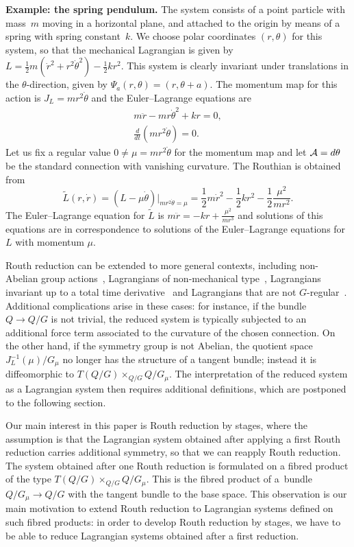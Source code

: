 \documentclass[pdftex]{sigma}
\newcommand{\A}{{\cal A}}
\begin{document}
{\bf Example: the spring pendulum.} The system consists of a point particle with mass~$m$ moving in a horizontal plane, and attached to the origin by means of a spring with spring constant~$k$.  We choose polar coordinates $(r,\theta)$ for this system, so that the mechanical Lagrangian is given by $L = \frac12 m (\dot r^2+ r^2\dot\theta^2)  - \frac12 k r^2$.  This system is clearly invariant under translations in the $\theta$-direction, given by  $\Psi_{a}(r,\theta) = (r,\theta+a)$. The momentum map for this action is $J_L=mr^2\dot\theta$ and the Euler--Lagrange equations are
\begin{gather*} m\ddot r - mr\dot\theta^2+kr =0,\\
\frac{d}{dt} (mr^2\dot\theta)= 0.
\end{gather*}
Let us f\/ix a regular value $0\neq\mu=mr^2\dot\theta$ for the momentum map and let $\A = d\theta$ be the standard connection with vanishing curvature. The Routhian is obtained from \[\tilde L(r,\dot r)=(L-\mu\dot\theta)|_{mr^2\dot\theta=\mu} = \frac12 m\dot r^2 -\frac12 k r^2 - \frac12\frac{\mu^2}{mr^2}.\]
The Euler--Lagrange equation for $\tilde L$ is $m\ddot r =- kr + \frac{\mu^2}{mr^3}$ and solutions of this equations are in correspondence to solutions of the Euler--Lagrange equations for $L$ with momentum $\mu$.


Routh reduction can be extended to more general contexts, including non-Abelian group actions~\cite{marsdenrouth},  Lagrangians of non-mechanical type~\cite{adamec,mestcram},   Lagrangians invariant up to a total time derivative~\cite{BC} and  Lagrangians that are not $G$-regular~\cite{BM}.  Additional complications arise in these cases: for instance, if the bundle $Q\to Q/G$ is not trivial, the reduced system is typically subjected to an additional force term associated to the curvature of the chosen connection. On the other hand, if the symmetry group is not Abelian, the quotient space $J^{-1}_L(\mu)/G_\mu$ no longer has the structure of a tangent bundle; instead it is dif\/feomorphic to $T(Q/G)\times_{Q/G} Q/G_\mu$. The interpretation of the reduced system as a Lagrangian system then requires additional def\/initions, which are postponed to the following section.

Our main interest in this paper is Routh reduction by stages, where the assumption is that the Lagrangian system obtained after applying a f\/irst Routh reduction carries additional symmetry, so that we can reapply Routh reduction. The system obtained after one Routh reduction is formulated on a f\/ibred product of the type $T(Q/G)\times_{Q/G} Q/G_\mu$. This is the f\/ibred product of a~bundle $Q/G_\mu \to Q/G$ with the tangent bundle to the base space. This observation is our main motivation to extend Routh reduction to Lagrangian systems def\/ined on such f\/ibred products:  in order to develop Routh reduction by stages, we have to be able to reduce Lagrangian systems obtained after a f\/irst reduction.
\end{document}
